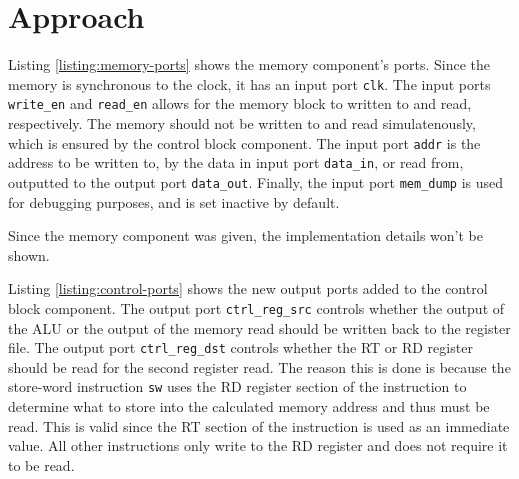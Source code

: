 \documentclass[11pt]{report}
\begin{document}
\newpage

\section*{Approach}

Listing \ref{listing:memory-ports} shows the memory component's ports. Since the memory is
synchronous to the clock, it has an input port \verb|clk|. The input ports \verb|write_en| and
\verb|read_en| allows for the memory block to written to and read, respectively. The memory should
not be written to and read simulatenously, which is ensured by the control block component. The
input port \verb|addr| is the address to be written to, by the data in input port \verb|data_in|, or
read from, outputted to the output port \verb|data_out|. Finally, the input port \verb|mem_dump| is
used for debugging purposes, and is set inactive by default.

Since
the memory component was given, the implementation details won't be shown.


Listing \ref{listing:control-ports} shows the new output ports added to the control block component.
The output port \verb|ctrl_reg_src| controls whether the output of the ALU or the output of the
memory read should be written back to the register file. The output port \verb|ctrl_reg_dst|
controls whether the RT or RD register should be read for the second register read. The reason this
is done is because the store-word instruction \verb|sw| uses the RD register section of the
instruction to determine what to store into the calculated memory address and thus must be read.
This is valid since the RT section of the instruction is used as an immediate value. All other
instructions only write to the RD register and does not require it to be read.
\end{document}
